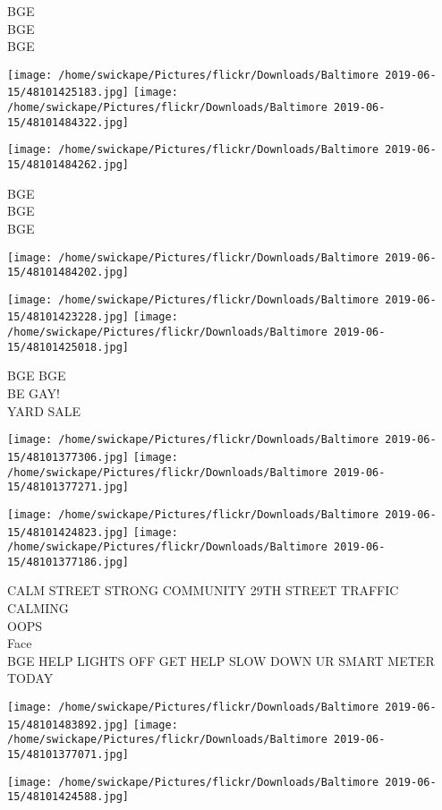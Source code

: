 \documentclass[10pt,letterpaper]{article}
\begin{document}
BGE\\
BGE\\
BGE
\pagebreak

\texttt{[image: /home/swickape/Pictures/flickr/Downloads/Baltimore 2019-06-15/48101425183.jpg]}
\texttt{[image: /home/swickape/Pictures/flickr/Downloads/Baltimore 2019-06-15/48101484322.jpg]}

\texttt{[image: /home/swickape/Pictures/flickr/Downloads/Baltimore 2019-06-15/48101484262.jpg]}

BGE\\
BGE\\
BGE
\pagebreak

\texttt{[image: /home/swickape/Pictures/flickr/Downloads/Baltimore 2019-06-15/48101484202.jpg]}

\vspace{0.25in}
\texttt{[image: /home/swickape/Pictures/flickr/Downloads/Baltimore 2019-06-15/48101423228.jpg]}
\texttt{[image: /home/swickape/Pictures/flickr/Downloads/Baltimore 2019-06-15/48101425018.jpg]}

BGE BGE\\
BE GAY!\\
YARD SALE
\pagebreak

\texttt{[image: /home/swickape/Pictures/flickr/Downloads/Baltimore 2019-06-15/48101377306.jpg]}
\texttt{[image: /home/swickape/Pictures/flickr/Downloads/Baltimore 2019-06-15/48101377271.jpg]}

\texttt{[image: /home/swickape/Pictures/flickr/Downloads/Baltimore 2019-06-15/48101424823.jpg]}
\texttt{[image: /home/swickape/Pictures/flickr/Downloads/Baltimore 2019-06-15/48101377186.jpg]}

CALM STREET STRONG COMMUNITY 29TH STREET TRAFFIC CALMING\\
OOPS\\
Face\\
BGE HELP LIGHTS OFF GET HELP SLOW DOWN UR SMART METER TODAY
\pagebreak

\texttt{[image: /home/swickape/Pictures/flickr/Downloads/Baltimore 2019-06-15/48101483892.jpg]}
\texttt{[image: /home/swickape/Pictures/flickr/Downloads/Baltimore 2019-06-15/48101377071.jpg]}

\texttt{[image: /home/swickape/Pictures/flickr/Downloads/Baltimore 2019-06-15/48101424588.jpg]}
\end{document}
